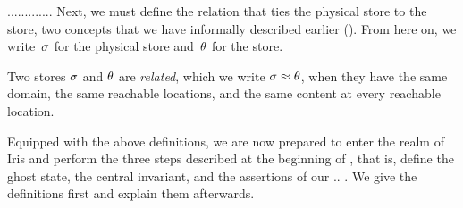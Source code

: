 \begin{definition}
\label{def:closed}

.............
Next, we must define the relation that ties the physical store to the
\logical store, two concepts that we have informally described earlier
(). From here on, we write~$\sigma$ for the physical
store and~$\theta$ for the \logical store.

\begin{definition}
\label{def:related}
  Two stores $\sigma$ and $\theta$ are \emph{related},
  which we write $\sigma\approx\theta$, when
  they have the same domain,
  the same reachable locations,
  and the same content at every reachable location.
\end{definition}

Equipped with the above definitions, we are now prepared to enter the realm of
Iris and perform the three steps described at the beginning of
, that is, define the ghost state, the central invariant,
and the assertions of our .. . We give the definitions first and explain them
afterwards.

\begin{comment}
A ghost memory cell in Iris is a memory cell that does not exist at runtime.
The ownership and the content of a physical memory cell are described via a
points-to predicate such as $\loc\pointsto\val$. Similarly, the ownership and
content of a ghost cell are described by an Iris assertion, usually written
$\ownGhost\gamma{a}$, where $\gamma$ is the name of the ghost cell and $a$ is
its content. Whereas the content of a physical memory cell is a
programming-language value~$\val$, the content of a ghost cell inhabits a
mathematical structure, a \emph{camera}~\cite[\S4.4]{iris}, which the user
chooses when the ghost cell is created. A camera is equipped with a
composition operation~$\cdot$ and the ghost state assertion satisfies the law
$\ownGhost\gamma{a\cdot b} \equiv \ownGhost\gamma{a} \star
\ownGhost\gamma{b}$. Thus, the choice of a suitable camera determines in what
ways the ghost state can be split.

A key Iris idiom involves the use of the \emph{authoritative
  camera}~\cite[\S6.3.3]{iris} together with an Iris invariant.
The elements of the authoritative camera include
\emph{authoritative elements} $\authfull{c}$ and
\emph{fragmentary elements} $\authfrag{b}$.
The composition law is defined in such a way that
there always exists at most one authoritative element
and the composition of all fragmentary elements in existence is
contained in the authoritative element, etc.
\end{comment}


\end{definition}
